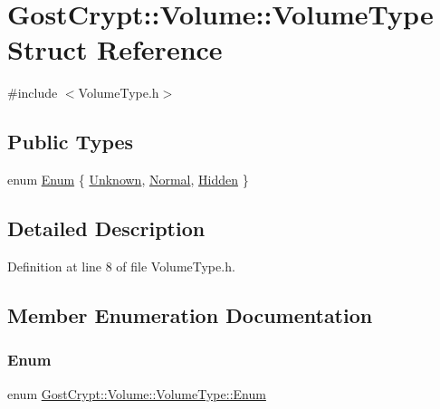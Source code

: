 \hypertarget{struct_gost_crypt_1_1_volume_1_1_volume_type}{}\section{Gost\+Crypt\+:\+:Volume\+:\+:Volume\+Type Struct Reference}
\label{struct_gost_crypt_1_1_volume_1_1_volume_type}


{\ttfamily \#include $<$Volume\+Type.\+h$>$}

\subsection*{Public Types}
\begin{DoxyCompactItemize}
\item 
enum \hyperlink{struct_gost_crypt_1_1_volume_1_1_volume_type_a7fe1979dab76d4534dcb1e26179d4717}{Enum} \{ \hyperlink{struct_gost_crypt_1_1_volume_1_1_volume_type_a7fe1979dab76d4534dcb1e26179d4717a00b5befddf2b1362a5a66b3a6567ff20}{Unknown}, 
\hyperlink{struct_gost_crypt_1_1_volume_1_1_volume_type_a7fe1979dab76d4534dcb1e26179d4717a2e98d12c6a29a172904ce0f54522000d}{Normal}, 
\hyperlink{struct_gost_crypt_1_1_volume_1_1_volume_type_a7fe1979dab76d4534dcb1e26179d4717a7c004ddd8efaefe8acc03aaf21df3091}{Hidden}
 \}
\end{DoxyCompactItemize}


\subsection{Detailed Description}


Definition at line 8 of file Volume\+Type.\+h.



\subsection{Member Enumeration Documentation}
\mbox{\label{struct_gost_crypt_1_1_volume_1_1_volume_type_a7fe1979dab76d4534dcb1e26179d4717}} 
\subsubsection{\texorpdfstring{Enum}{Enum}}
{\footnotesize\ttfamily enum \hyperlink{struct_gost_crypt_1_1_volume_1_1_volume_type_a7fe1979dab76d4534dcb1e26179d4717}{Gost\+Crypt\+::\+Volume\+::\+Volume\+Type\+::\+Enum}}

